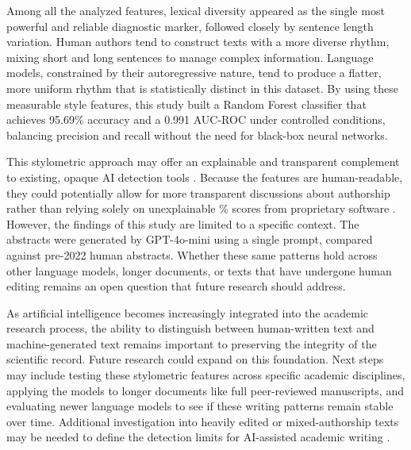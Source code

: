 \documentclass{article}
\begin{document}
Among all the analyzed features, lexical diversity appeared as the single most powerful and reliable diagnostic marker, followed closely by sentence length variation. Human authors tend to construct texts with a more diverse rhythm, mixing short and long sentences to manage complex information. Language models, constrained by their autoregressive nature, tend to produce a flatter, more uniform rhythm that is statistically distinct in this dataset. By using these measurable style features, this study built a Random Forest classifier that achieves 95.69\% accuracy and a 0.991 AUC-ROC under controlled conditions, balancing precision and recall without the need for black-box neural networks.

This stylometric approach may offer an explainable and transparent complement to existing, opaque AI detection tools \cite{ref5,ref6}. Because the features are human-readable, they could potentially allow for more transparent discussions about authorship rather than relying solely on unexplainable \% scores from proprietary software \cite{ref6}. However, the findings of this study are limited to a specific context. The abstracts were generated by GPT-4o-mini using a single prompt, compared against pre-2022 human abstracts. Whether these same patterns hold across other language models, longer documents, or texts that have undergone human editing remains an open question that future research should address.

As artificial intelligence becomes increasingly integrated into the academic research process, the ability to distinguish between human-written text and machine-generated text remains important to preserving the integrity of the scientific record. Future research could expand on this foundation. Next steps may include testing these stylometric features across specific academic disciplines, applying the models to longer documents like full peer-reviewed manuscripts, and evaluating newer language models to see if these writing patterns remain stable over time. Additional investigation into heavily edited or mixed-authorship texts may be needed to define the detection limits for AI-assisted academic writing \cite{ref7}.
\end{document}
